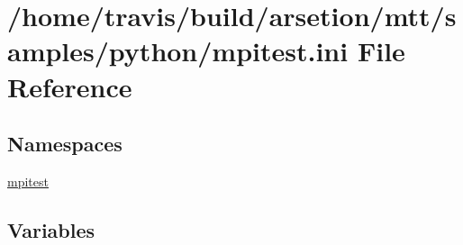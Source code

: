 \hypertarget{mpitest_8ini}{\section{/home/travis/build/arsetion/mtt/samples/python/mpitest.ini File Reference}
\label{mpitest_8ini}
}
\subsection*{Namespaces}
\begin{DoxyCompactItemize}
\item 
\hyperlink{namespacempitest}{mpitest}
\end{DoxyCompactItemize}
\subsection*{Variables}
